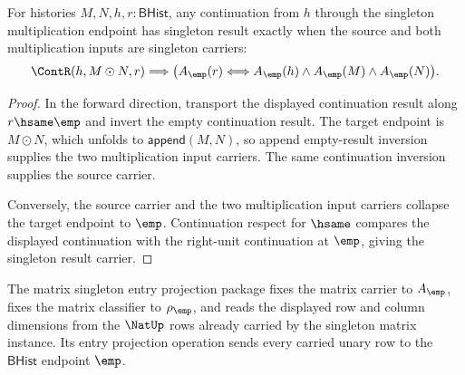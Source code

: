 \begin{theorem}
\label{thm:matrix-singleton-mul-continuation-result-carrier}
For histories $M,N,h,r:\mathsf{BHist}$, any continuation from $h$ through the
singleton multiplication endpoint has singleton result exactly when the source
and both multiplication inputs are singleton carriers:
$$
\ContR(h,M\odot N,r)
\Longrightarrow
\bigl(A_{\emp}(r)\Longleftrightarrow
A_{\emp}(h)\land A_{\emp}(M)\land A_{\emp}(N)\bigr).
$$
\end{theorem}
\begin{proof}
In the forward direction, transport the displayed continuation result along
$r\hsame\emp$ and invert the empty continuation result. The target endpoint is
$M\odot N$, which unfolds to $\mathsf{append}(M,N)$, so append empty-result
inversion supplies the two multiplication input carriers. The same continuation
inversion supplies the source carrier.

Conversely, the source carrier and the two multiplication input carriers
collapse the target endpoint to $\emp$. Continuation respect for $\hsame$
compares the displayed continuation with the right-unit continuation at
$\emp$, giving the singleton result carrier.
\end{proof}

\begin{definition}
\label{def:matrix-singleton-entry-projection-package}
The matrix singleton entry projection package fixes the matrix carrier to
$A_{\emp}$, fixes the matrix classifier to $\rho_{\emp}$, and reads the
displayed row and column dimensions from the $\NatUp$ rows already carried by
the singleton matrix instance. Its entry projection operation sends every
carried unary row to the $\mathsf{BHist}$ endpoint $\emp$.
\end{definition}


